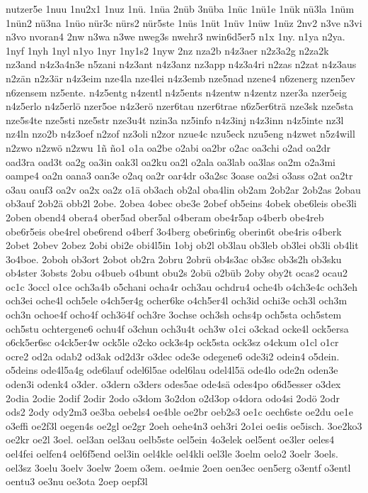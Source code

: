 {nutzer5e
1nuu
1nu2x1
1nuz
1nü.
1nüa
2nüb
3nüba
1nüc
1nü1e
1nük
nü3la
1nüm
1nün2
nü3na
1nüo
nür3c
nürs2
nür5ste
1nüs
1nüt
1nüv
1nüw
1nüz
2nv2
n3ve
n3vi
n3vo
nvoran4
2nw
n3wa
n3we
nweg3s
nwehr3
nwin6d5er5
n1x
1ny.
n1ya
n2ya.
1nyf
1nyh
1nyl
n1yo
1nyr
1ny1s2
1nyw
2nz
nza2b
n4z3aer
n2z3a2g
n2za2k
nz3and
n4z3a4n3e
n5zani
n4z3ant
n4z3anz
nz3app
n4z3a4ri
n2zas
n2zat
n4z3aus
n2zän
n2z3är
n4z3eim
nze4la
nze4lei
n4z3emb
nze5nad
nzene4
n6zenerg
nzen5ev
n6zensem
nz5ente.
n4z5entg
n4zentl
n4z5ents
n4zentw
n4zentz
nzer3a
nzer5eig
n4z5erlo
n4z5erlö
nzer5oe
n4z3erö
nzer6tau
nzer6trae
n6z5er6trä
nze3sk
nze5sta
nze5s4te
nze5sti
nze5str
nze3u4t
nzin3a
nz5info
n4z3inj
n4z3inn
n4z5inte
nz3l
nz4ln
nzo2b
n4z3oef
n2zof
nz3oli
n2zor
nzue4c
nzu5eck
nzu5eng
n4zwet
n5z4will
n2zwo
n2zwö
n2zwu
1ñ
ño1
o1a
oa2be
o2abi
oa2br
o2ac
oa3chi
o2ad
oa2dr
oad3ra
oad3t
oa2g
oa3in
oak3l
oa2ku
oa2l
o2ala
oa3lab
oa3las
oa2m
o2a3mi
oampe4
oa2n
oana3
oan3e
o2aq
oa2r
oar4dr
o3a2sc
3oase
oa2si
o3ass
o2at
oa2tr
o3au
oauf3
oa2v
oa2x
oa2z
o1ä
ob3ach
ob2al
oba4lin
ob2am
2ob2ar
2ob2as
2obau
ob3auf
2ob2ä
obb2l
2obe.
2obea
4obec
obe3e
2obef
ob5eins
4obek
obe6leis
obe3li
2oben
obend4
obera4
ober5ad
ober5al
o4beram
obe4r5ap
o4berb
obe4reb
obe6r5eis
obe4rel
obe6rend
o4berf
3o4berg
obe6rin6g
oberin6t
obe4ris
o4berk
2obet
2obev
2obez
2obi
obi2e
obi4l5in
1obj
ob2l
ob3lau
ob3leb
ob3lei
ob3li
ob4lit
3o4boe.
2oboh
ob3ort
2obot
ob2ra
2obru
2obrü
ob4s3ac
ob3sc
ob3s2h
ob3sku
ob4ster
3obsts
2obu
o4bueb
o4bunt
obu2s
2obü
o2büb
2oby
oby2t
ocas2
ocau2
oc1c
3occl
o1ce
och3a4b
o5chani
ocha4r
och3au
ochdru4
oche4b
o4ch3e4c
och3eh
och3ei
oche4l
och5ele
o4ch5er4g
ocher6ke
o4ch5er4l
och3id
ochi3e
och3l
och3m
och3n
ochoe4f
ocho4f
och3ö4f
och3re
3ochse
och3sh
ochs4p
och5sta
och5stem
och5stu
ochtergene6
ochu4f
o3chun
och3u4t
och3w
o1ci
o3ckad
ocke4l
ock5ersa
o6ck5er6sc
o4ck5er4w
ock5le
o2cko
ock3s4p
ock5sta
ock3sz
o4ckum
o1cl
o1cr
ocre2
od2a
odab2
od3ak
od2d3r
o3dec
ode3e
odegene6
ode3i2
odein4
o5dein.
o5deins
ode4l5a4g
ode6lauf
odel6l5ae
odel6lau
odel4l5ä
ode4lo
ode2n
oden3e
oden3i
odenk4
o3der.
o3dern
o3ders
odes5ae
ode4sä
odes4po
o6d5esser
o3dex
2odia
2odie
2odif
2odir
2odo
o3dom
3o2don
o2d3op
o4dora
odo4si
2odö
2odr
ods2
2ody
ody2m3
oe3ba
oebels4
oe4ble
oe2br
oeb2s3
oe1c
oech6ste
oe2du
oe1e
o3effi
oe2f3l
oegen4s
oe2gl
oe2gr
2oeh
oehe4n3
oeh3ri
2o1ei
oe4is
oe5isch.
3oe2ko3
oe2kr
oe2l
3oel.
oel3an
oel3au
oelb5ste
oel5ein
4o3elek
oel5ent
oe3ler
oeles4
oel4fei
oelfen4
oel6f5end
oel3in
oel4kle
oel4kli
oel3le
3oelm
oelo2
3oelr
3oels.
oel3sz
3oelu
3oelv
3oelw
2oem
o3em.
oe4mie
2oen
oen3ec
oen5erg
o3entf
o3entl
oentu3
oe3nu
oe3ota
2oep
oepf3l
}
